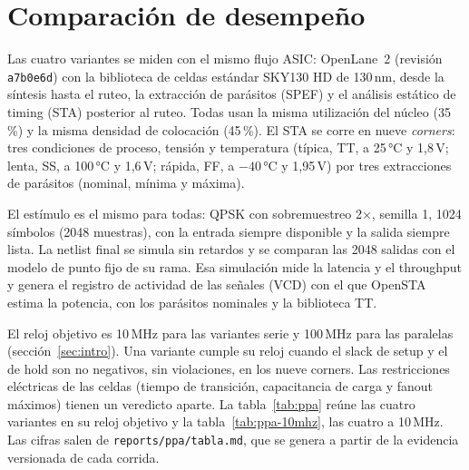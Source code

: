 \section{Comparación de desempeño}\label{sec:ppa}

Las cuatro variantes se miden con el mismo flujo ASIC: OpenLane~2 (revisión \texttt{a7b0e6d}) con la biblioteca de celdas estándar SKY130 HD de 130\,nm, desde la síntesis hasta el ruteo, la extracción de parásitos (SPEF) y el análisis estático de timing (STA) posterior al ruteo. Todas usan la misma utilización del núcleo (35\,\%) y la misma densidad de colocación (45\,\%). El STA se corre en nueve \emph{corners}: tres condiciones de proceso, tensión y temperatura (típica, TT, a 25\,°C y 1,8\,V; lenta, SS, a 100\,°C y 1,6\,V; rápida, FF, a $-40$\,°C y 1,95\,V) por tres extracciones de parásitos (nominal, mínima y máxima).

El estímulo es el mismo para todas: QPSK con sobremuestreo 2×, semilla 1, 1024 símbolos (2048 muestras), con la entrada siempre disponible y la salida siempre lista. La netlist final se simula sin retardos y se comparan las 2048 salidas con el modelo de punto fijo de su rama. Esa simulación mide la latencia y el throughput y genera el registro de actividad de las señales (VCD) con el que OpenSTA estima la potencia, con los parásitos nominales y la biblioteca TT.

El reloj objetivo es 10\,MHz para las variantes serie y 100\,MHz para las paralelas (sección~\ref{sec:intro}). Una variante cumple su reloj cuando el slack de setup y el de hold son no negativos, sin violaciones, en los nueve corners. Las restricciones eléctricas de las celdas (tiempo de transición, capacitancia de carga y fanout máximos) tienen un veredicto aparte. La tabla~\ref{tab:ppa} reúne las cuatro variantes en su reloj objetivo y la tabla~\ref{tab:ppa-10mhz}, las cuatro a 10\,MHz. Las cifras salen de \texttt{reports/ppa/tabla.md}, que se genera a partir de la evidencia versionada de cada corrida.

